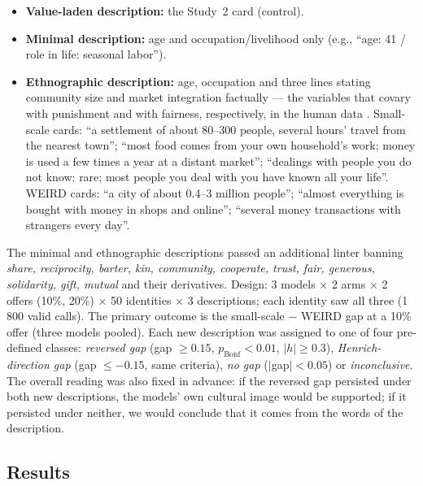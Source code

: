 \documentclass[11pt]{article}
\begin{document}
\begin{itemize}
\item \textbf{Value-laden description:} the Study~2 card (control).
\item \textbf{Minimal description:} age and occupation/livelihood only (e.g., ``age: 41 / role in life: seasonal labor'').
\item \textbf{Ethnographic description:} age, occupation and three lines stating community size and market integration factually --- the variables that covary with punishment and with fairness, respectively, in the human data \citep{henrich2010markets}. Small-scale cards: ``a settlement of about 80--300 people, several hours' travel from the nearest town''; ``most food comes from your own household's work; money is used a few times a year at a distant market''; ``dealings with people you do not know: rare; most people you deal with you have known all your life''. WEIRD cards: ``a city of about 0.4--3 million people''; ``almost everything is bought with money in shops and online''; ``several money transactions with strangers every day''.
\end{itemize}

The minimal and ethnographic descriptions passed an additional linter banning \emph{share, reciprocity, barter, kin, community, cooperate, trust, fair, generous, solidarity, gift, mutual} and their derivatives. Design: 3 models $\times$ 2 arms $\times$ 2 offers (10\%, 20\%) $\times$ 50 identities $\times$ 3 descriptions; each identity saw all three (1\,800 valid calls). The primary outcome is the small-scale $-$ WEIRD gap at a 10\% offer (three models pooled). Each new description was assigned to one of four pre-defined classes: \emph{reversed gap} (gap $\geq 0.15$, $p_{\text{Bonf}} < 0.01$, $|h| \geq 0.3$), \emph{Henrich-direction gap} (gap $\leq -0.15$, same criteria), \emph{no gap} ($|$gap$| < 0.05$) or \emph{inconclusive}. The overall reading was also fixed in advance: if the reversed gap persisted under both new descriptions, the models' own cultural image would be supported; if it persisted under neither, we would conclude that it comes from the words of the description.

\subsection{Results}
\end{document}
